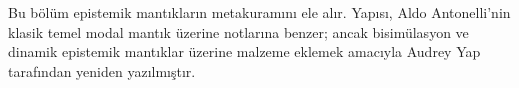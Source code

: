 


\begin{editorial}
  Bu bölüm epistemik mantıkların metakuramını ele alır. Yapısı, Aldo
  Antonelli'nin klasik temel modal mantık üzerine notlarına benzer; ancak
  bisimülasyon ve dinamik epistemik mantıklar üzerine malzeme eklemek amacıyla
  Audrey Yap tarafından yeniden yazılmıştır.
\end{editorial}



\OLEndChapterHook

